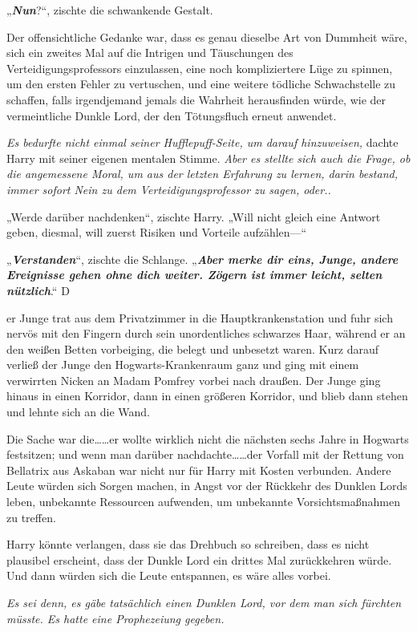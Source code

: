 {„\textbf{\emph{Nun}}?“, zischte die schwankende Gestalt.

Der offensichtliche Gedanke war, dass es genau dieselbe Art von Dummheit wäre, sich ein zweites Mal auf die Intrigen und Täuschungen des Verteidigungsprofessors einzulassen, eine noch kompliziertere Lüge zu spinnen, um den ersten Fehler zu vertuschen, und eine weitere tödliche Schwachstelle zu schaffen, falls irgendjemand jemals die Wahrheit herausfinden würde, wie der vermeintliche Dunkle Lord, der den Tötungsfluch erneut anwendet.

\emph{Es bedurfte nicht einmal seiner Hufflepuff-Seite, um darauf hinzuweisen,} dachte Harry mit seiner eigenen mentalen Stimme. \emph{Aber es stellte sich auch die Frage, ob die angemessene Moral, um aus der letzten Erfahrung zu lernen, darin bestand, immer sofort Nein zu dem Verteidigungsprofessor zu sagen, oder..}

„Werde darüber nachdenken“, zischte Harry. „Will nicht gleich eine Antwort geben, diesmal, will zuerst Risiken und Vorteile aufzählen—“

„\textbf{\emph{Verstanden}}“, zischte die Schlange. „\textbf{\emph{Aber merke dir eins, Junge, andere Ereignisse gehen ohne dich weiter. Zögern ist immer leicht, selten nützlich}}.“ D

er Junge trat aus dem Privatzimmer in die Hauptkrankenstation und fuhr sich nervös mit den Fingern durch sein unordentliches schwarzes Haar, während er an den weißen Betten vorbeiging, die belegt und unbesetzt waren. Kurz darauf verließ der Junge den Hogwarts-Krankenraum ganz und ging mit einem verwirrten Nicken an Madam Pomfrey vorbei nach draußen. Der Junge ging hinaus in einen Korridor, dann in einen größeren Korridor, und blieb dann stehen und lehnte sich an die Wand.

Die Sache war die……er wollte wirklich nicht die nächsten sechs Jahre in Hogwarts festsitzen; und wenn man darüber nachdachte……der Vorfall mit der Rettung von Bellatrix aus Askaban war nicht nur für Harry mit Kosten verbunden. Andere Leute würden sich Sorgen machen, in Angst vor der Rückkehr des Dunklen Lords leben, unbekannte Ressourcen aufwenden, um unbekannte Vorsichtsmaßnahmen zu treffen.

Harry könnte verlangen, dass sie das Drehbuch so schreiben, dass es nicht plausibel erscheint, dass der Dunkle Lord ein drittes Mal zurückkehren würde. Und dann würden sich die Leute entspannen, es wäre alles vorbei.

\emph{Es sei denn, es gäbe tatsächlich einen Dunklen Lord, vor dem man sich fürchten müsste. Es hatte eine Prophezeiung gegeben.}

}
